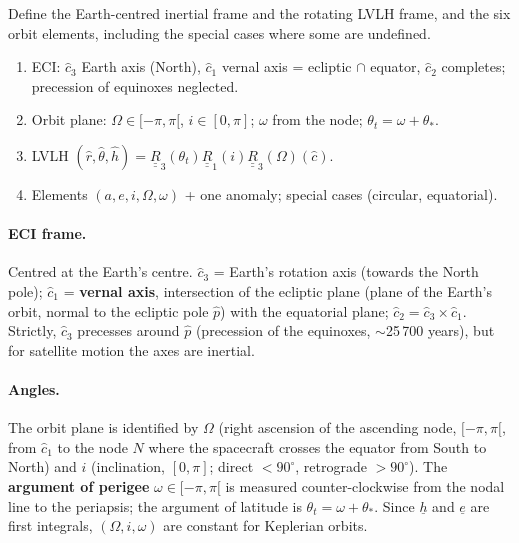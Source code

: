 \begin{qbox}
Define the Earth-centred inertial frame and the rotating LVLH frame, and the six orbit elements, including the special cases where some are undefined.
\end{qbox}
\begin{outline}
\begin{enumerate}
\item ECI: $\hat c_3$ Earth axis (North), $\hat c_1$ vernal axis = ecliptic $\cap$ equator, $\hat c_2$ completes; precession of equinoxes neglected.
\item Orbit plane: $\Omega\in[-\pi,\pi[$, $i\in[0,\pi]$; $\omega$ from the node; $\theta_t=\omega+\theta_*$.
\item LVLH $(\hat r,\hat\theta,\hat h)=\underline{\underline R}_3(\theta_t)\underline{\underline R}_1(i)\underline{\underline R}_3(\Omega)(\hat c)$.
\item Elements $(a,e,i,\Omega,\omega)$ + one anomaly; special cases (circular, equatorial).
\end{enumerate}
\end{outline}
\answer
\paragraph{ECI frame.} Centred at the Earth's centre. $\hat c_3$ = Earth's rotation axis (towards the North pole); $\hat c_1$ = \textbf{vernal axis},
intersection of the ecliptic plane (plane of the Earth's orbit, normal to the ecliptic pole $\hat p$) with the equatorial plane; $\hat c_2=\hat c_3\times\hat c_1$.
Strictly, $\hat c_3$ precesses around $\hat p$ (precession of the equinoxes, $\sim$25\,700 years), but for satellite motion the axes are inertial.

\paragraph{Angles.} The orbit plane is identified by $\Omega$ (right ascension of the ascending node, $[-\pi,\pi[$, from $\hat c_1$ to the node $N$
where the spacecraft crosses the equator from South to North) and $i$ (inclination, $[0,\pi]$; direct $<90^\circ$, retrograde $>90^\circ$).
The \textbf{argument of perigee} $\omega\in[-\pi,\pi[$ is measured counter-clockwise from the nodal line to the periapsis; the argument of latitude
is $\theta_t=\omega+\theta_*$. Since $\underline h$ and $\underline e$ are first integrals, $(\Omega,i,\omega)$ are constant for Keplerian orbits.

